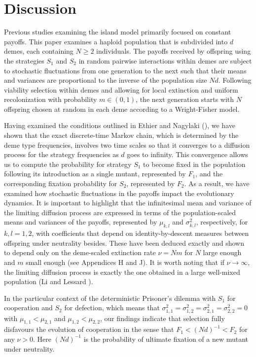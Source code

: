 \documentclass[11pt]{article}
\begin{document}
\section{Discussion}

Previous studies examining the island model primarily focused on constant payoffs. This paper examines a haploid population that is subdivided into $d$ demes, each containing $N\geq2$ individuals. The payoffs received by offspring using the strategies $S_1$ and $S_2$ in random pairwise interactions within demes are subject to stochastic fluctuations from one generation to the next such that their means and variances are proportional to the inverse of the population size $Nd$. Following viability selection within demes and allowing for local extinction and uniform recolonization with probability $m\in (0, 1)$,  the next generation starts with $N$ offspring chosen at random in each deme according to a Wright-Fisher model.


Having examined the conditions outlined in Ethier and Nagylaki (\cite{EN1980}), we have shown that the exact discrete-time Markov chain, which is determined by the deme type frequencies, involves two time scales so that it converges to a diffusion process for the strategy frequencies as $d$ goes to infinity. This convergence allows us to compute the probability for strategy $S_1$ to become fixed in the population following its introduction as a single mutant, represented by $F_1$, and the corresponding fixation probability for $S_2$, represented by $F_2$.  As a result, we have examined how stochastic fluctuations in the payoffs  impact the evolutionary dynamics. It is important to highlight that the infinitesimal mean and variance of the limiting diffusion process are expressed in terms of the population-scaled means and variances of the payoffs, represented by $\mu_{k,l}$ and $\sigma^2_{k,l}$, respectively, for $k,l=1,2$, with coefficients that depend on identity-by-descent measures between offspring under neutrality besides. These have been deduced exactly and shown to depend only on the deme-scaled extinction rate $\nu=Nm$ for $N$ large enough and $m$ small enough (see Appendices H and J). 
It is worth noting that if $\nu\rightarrow\infty$, the limiting diffusion process is exactly the one obtained in a large well-mixed population  (Li and Lessard \cite{LL2020}).


In the particular context of the deterministic Prisoner's dilemma with $S_1$ for cooperation and $S_2$ for defection, which means that $\sigma^2_{1,1}=\sigma^2_{1,2}=\sigma^2_{2,1}=\sigma^2_{2,2}=0$ with $\mu_{1,1}<\mu_{2,1}$ and $\mu_{1,2}<\mu_{2,2}$, our findings indicate that selection fully disfavours the evolution of cooperation in the sense that $F_1<(Nd)^{-1}<F_2$ for any $\nu>0$. Here $(Nd)^{-1}$ is the probability of ultimate fixation of a new mutant under neutrality.
\end{document}
